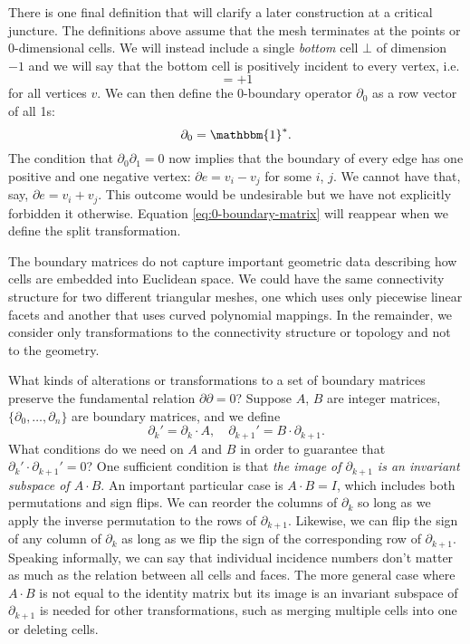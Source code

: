 \documentclass[twocolumn]{article}
\begin{document}
There is one final definition that will clarify a later construction at a critical juncture.
The definitions above assume that the mesh terminates at the points or 0-dimensional cells.
We will instead include a single \emph{bottom} cell $\bot$ of dimension $-1$ and we will say that the bottom cell is positively incident to every vertex, i.e.
\begin{equation}
    [v, \bot] = +1
\end{equation}
for all vertices $v$.
We can then define the 0-boundary operator $\partial_0$ as a row vector of all 1s:
\begin{equation}
    \partial_0 = \mathbbm{1}^*.
    \label{eq:0-boundary-matrix}
\end{equation}
The condition that $\partial_0\partial_1 = 0$ now implies that the boundary of every edge has one positive and one negative vertex: $\partial e = v_i - v_j$ for some $i$, $j$.
We cannot have that, say, $\partial e = v_i + v_j$.
This outcome would be undesirable but we have not explicitly forbidden it otherwise.
Equation \eqref{eq:0-boundary-matrix} will reappear when we define the split transformation.

The boundary matrices do not capture important geometric data describing how cells are embedded into Euclidean space.
We could have the same connectivity structure for two different triangular meshes, one which uses only piecewise linear facets and another that uses curved polynomial mappings.
In the remainder, we consider only transformations to the connectivity structure or topology and not to the geometry.

What kinds of alterations or transformations to a set of boundary matrices preserve the fundamental relation $\partial\partial = 0$?
Suppose $A$, $B$ are integer matrices, $\{\partial_0, \ldots, \partial_n\}$ are boundary matrices, and we define
\begin{equation}
    \partial_k' = \partial_k\cdot A, \quad \partial_{k + 1}' = B\cdot\partial_{k + 1}.
\end{equation}
What conditions do we need on $A$ and $B$ in order to guarantee that $\partial_k'\cdot\partial_{k + 1}' = 0$?
One sufficient condition is that \emph{the image of $\partial_{k + 1}$ is an invariant subspace of $A\cdot B$}.
An important particular case is $A\cdot B = I$, which includes both permutations and sign flips.
We can reorder the columns of $\partial_k$ so long as we apply the inverse permutation to the rows of $\partial_{k + 1}$.
Likewise, we can flip the sign of any column of $\partial_k$ as long as we flip the sign of the corresponding row of $\partial_{k + 1}$.
Speaking informally, we can say that individual incidence numbers don't matter as much as the relation between all cells and faces.
The more general case where $A\cdot B$ is not equal to the identity matrix but its image is an invariant subspace of $\partial_{k + 1}$ is needed for other transformations, such as merging multiple cells into one or deleting cells.
\end{document}
